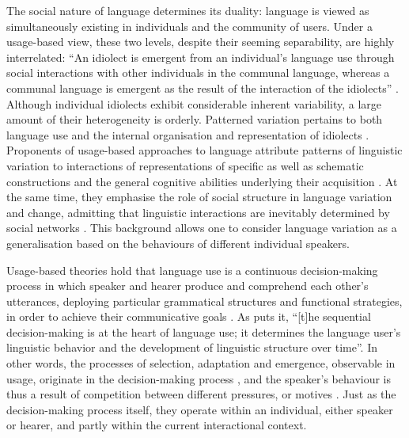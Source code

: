 The social nature of language determines its duality: language is viewed as simultaneously existing in individuals and the community of users. Under a usage-based view, these two levels, despite their seeming separability, are highly interrelated: ``An idiolect is emergent from an individual's language use through social interactions with other individuals in the communal language, whereas a communal language is emergent as the result of the interaction of the idiolects'' \citep[15]{five-graces}. Although individual idiolects exhibit considerable inherent variability, a large amount of their heterogeneity is orderly. Patterned variation pertains to both language use \citep{weinreich-etal68} and the internal organisation and representation of idiolects \citep{dabrowska1997}. Proponents of usage-based approaches to language attribute patterns of linguistic variation to interactions of representations of specific as well as schematic constructions and the general cognitive abilities underlying their acquisition \citep[15]{five-graces}. At the same time, they emphasise the role of social structure in language variation and change, admitting that linguistic interactions are inevitably determined by social networks \citep{milroy1980,eckert2000}. This background allows one to consider language variation as a generalisation based on the behaviours of different individual speakers.

Usage-based theories hold that language use is a continuous decision-making process in which speaker and hearer produce and comprehend each other's utterances, deploying particular grammatical structures and functional strategies, in order to achieve their communicative goals \citep{bates-macwhinney1989,five-graces,bybee-book-2010,dubois2014,macwhinney2014,christiansen-chater-2016}. As \citet[][841]{diessel-review} puts it, ``[t]he sequential de\-ci\-sion-making is at the heart of language use; it determines the language user's linguistic behavior and the development of linguistic structure over time''. In other words, the processes of selection, adaptation and emergence, observable in usage, originate in the decision-making process \citep[264--265]{dubois2014}, and the speaker's behaviour is thus a result of competition between different pressures, or motives \citep{bates-macwhinney1989,competing}. Just as the decision-making process itself, they operate within an individual, either speaker or hearer, and partly within the current interactional context.

